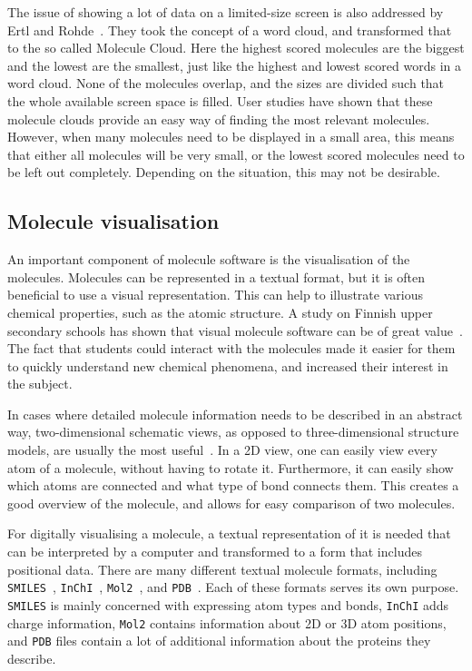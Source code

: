 The issue of showing a lot of data on a limited-size screen is also addressed by Ertl and Rohde~\cite{ertl2012molecule}. They took the concept of a word cloud, and transformed that to the so called Molecule Cloud. Here the highest scored molecules are the biggest and the lowest are the smallest, just like the highest and lowest scored words in a word cloud. None of the molecules overlap, and the sizes are divided such that the whole available screen space is filled. User studies have shown that these molecule clouds provide an easy way of finding the most relevant molecules. However, when many molecules need to be displayed in a small area, this means that either all molecules will be very small, or the lowest scored molecules need to be left out completely. Depending on the situation, this may not be desirable.


\subsection{Molecule visualisation}
An important component of molecule software is the visualisation of the molecules. Molecules can be represented in a textual format, but it is often beneficial to use a visual representation. This can help to illustrate various chemical properties, such as the atomic structure. A study on Finnish upper secondary schools has shown that visual molecule software can be of great value~\cite{aksela2008computer}. The fact that students could interact with the molecules made it easier for them to quickly understand new chemical phenomena, and increased their interest in the subject.

In cases where detailed molecule information needs to be described in an abstract way, two-dimensional schematic views, as opposed to three-dimensional structure models, are usually the most useful~\cite{zhou2009molecular}. In a 2D view, one can easily view every atom of a molecule, without having to rotate it. Furthermore, it can easily show which atoms are connected and what type of bond connects them. This creates a good overview of the molecule, and allows for easy comparison of two molecules.

For digitally visualising a molecule, a textual representation of it is needed that can be interpreted by a computer and transformed to a form that includes positional data. There are many different textual molecule formats, including \verb|SMILES|~\cite{daylight1992daylight}, \verb|InChI|~\cite{heller2013inchi}, \verb|Mol2|~\cite{tripos2005tripos}, and \verb|PDB|~\cite{bernstein1977protein}. Each of these formats serves its own purpose. \verb|SMILES| is mainly concerned with expressing atom types and bonds, \verb|InChI| adds charge information, \verb|Mol2| contains information about 2D or 3D atom positions, and \verb|PDB| files contain a lot of additional information about the proteins they describe.

